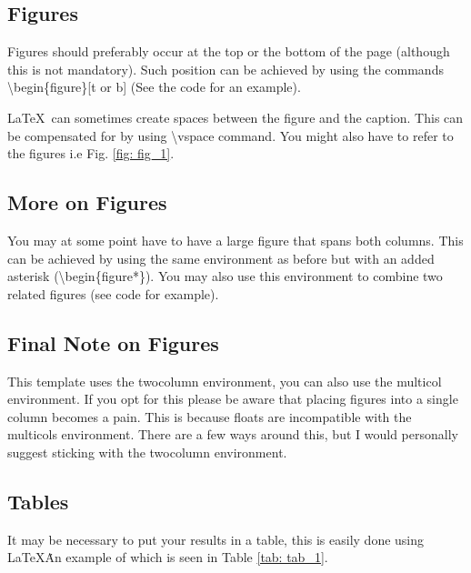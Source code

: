 \documentclass[a4paper,12pt, onecolumn, notitlepage]{article}
\begin{document}
\subsection{Figures}
Figures should preferably occur at the top or the bottom of the page (although this is not mandatory). Such position can be achieved by using the commands \textbackslash begin\{figure\}[t or b] (See the code for an example).  


\LaTeX\ can sometimes create spaces between the figure and the caption. This can be compensated for by using \textbackslash vspace command. You might also have to refer to the figures i.e Fig. \ref{fig: fig_1}.

\vspace{-5mm}

\subsection{More on Figures}
You may at some point have to have a large figure that spans both columns. This can be achieved by using the same environment as before but with an added asterisk (\textbackslash begin\{figure*\}). You may also use this environment to combine two related figures (see code for example).

\subsection{Final Note on Figures}
This template uses the twocolumn environment, you can also use the multicol environment. If you opt for this please be aware that placing figures into a single column becomes a pain. This is because floats are incompatible with the multicols environment. There are a few ways around this, but I would personally suggest sticking with the twocolumn environment.

\subsection{Tables}
\label{table}
It may be necessary to put your results in a table, this is easily done using \LaTeX\. An example of which is seen in Table \ref{tab: tab_1}.
\end{document}
